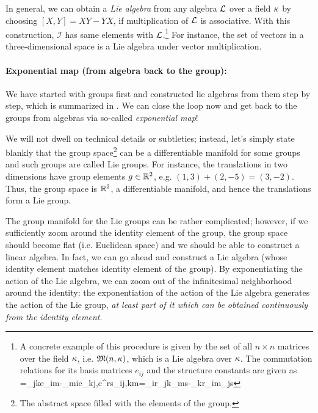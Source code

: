 In general, we can obtain a \emph{Lie algebra} from any algebra $\mathcal{L}$ over a field $\kappa$ by choosing $[X,Y]=XY-YX$, if multiplication of $\mathcal{L}$ is associative. With this construction, $\mathcal{I}$ has same elements with $\mathcal{L}$.\footnote{A concrete example of this procedure is given by the set of all $n\times n$ matrices over the field $\kappa$, i.e. $\mathfrak{M}(n,\kappa)$, which is a Lie algebra over $\kappa$. The commutation relations for its basis matrices $e_{ij}$ and the structure constants are given as
	\be 
	[e_{ij},e_{km}]=\delta_{jk}e_{im}-\delta_{mi}e_{kj}\;,\quad c^{rs}_{ij,km}=\delta_{ir}\delta_{jk}\delta_{ms}-\delta_{kr}\delta_{im}\delta_{js}
	\ee 
} For instance, the set of vectors in a three-dimensional space is a Lie algebra under vector multiplication.

\paragraph{Exponential map (from algebra back to the group):} We have started with groups first and constructed lie algebras from them step by step, which is summarized in \figref{\ref{fig: group-field-algebra}}. We can close the loop now and get back to the groups from algebras via so-called \emph{exponential map}!

We will not dwell on technical details or subtleties; instead, let's simply state blankly that the group space\footnote{The abstract space filled with the elements of the group.} can be a differentiable manifold for some groups and such groups are called Lie groups. For instance, the translations in two dimensions have group elements $g\in\mathbb{R}^2$, e.g. $(1,3)+(2,-5)=(3,-2)$. Thus, the group space is $\mathbb{R}^2$, a differentiable manifold, and hence the translations form a Lie group.

The group manifold for the Lie groups can be rather complicated; however, if we sufficiently zoom around the identity element of the group, the group space should become flat (i.e. Euclidean space) and we should be able to construct a linear algebra. In fact, we can go ahead and construct a Lie algebra (whose identity element matches identity element of the group). By exponentiating the action of the Lie algebra, we can zoom out of the infinitesimal neighborhood around the identity: the exponentiation of the action of the Lie algebra generates the action of the Lie group, \emph{at least part of it which can be obtained continuously from the identity element}.

